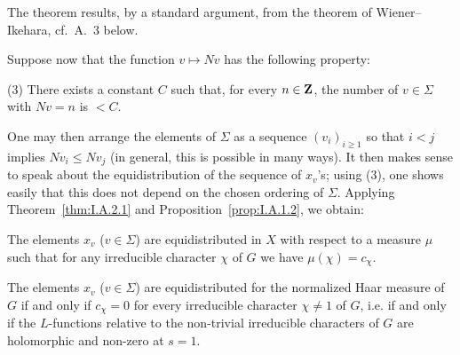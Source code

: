 The theorem results, by a standard argument, from the theorem of Wiener--Ikehara, cf.~A.~3 below.

Suppose now that the function $v \mapsto Nv$ has the following property:

(3) There exists a constant $C$ such that, for every $n \in \mathbf{Z}$, the number of $v \in \Sigma$ with $Nv = n$ is $< C$.

One may then arrange the elements of $\Sigma$ as a sequence $(v_i)_{i \geq 1}$ so that $i < j$ implies $Nv_i \leq Nv_j$ (in general, this is possible in many ways). It then makes sense to speak about the equidistribution of the sequence of $x_v$'s; using (3), one shows easily that this does not depend on the chosen ordering of $\Sigma$. Applying Theorem~\ref{thm:I.A.2.1} and Proposition~\ref{prop:I.A.1.2}, we obtain:

\begin{theorem}[2]\label{thm:I.A.2.2}
The elements $x_v$ ($v \in \Sigma$) are equidistributed in $X$ with respect to a measure $\mu$ such that for any irreducible character $\chi$ of $G$ we have $\mu(\chi) = c_\chi$.
\end{theorem}

\begin{corollary}
The elements $x_v$ ($v \in \Sigma$) are equidistributed for the normalized Haar measure of $G$ if and only if $c_\chi = 0$ for every irreducible character $\chi \neq 1$ of $G$, i.e. if and only if the $L$-functions relative to the non-trivial irreducible characters of $G$ are holomorphic and non-zero at $s = 1$.
\end{corollary}

